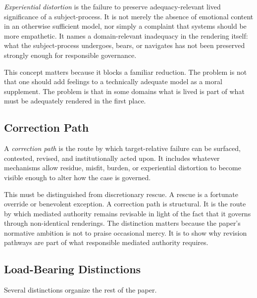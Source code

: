 \documentclass[11pt]{article}
\renewcommand{\emph}[1]{\textit{#1}}
\begin{document}
\emph{Experiential distortion} is the failure to preserve adequacy-relevant lived significance of a subject-process. It is not merely the absence of emotional content in an otherwise sufficient model, nor simply a complaint that systems should be more empathetic. It names a domain-relevant inadequacy in the rendering itself: what the subject-process undergoes, bears, or navigates has not been preserved strongly enough for responsible governance. \cite{Swanson2026EmbeddedProcess,Fricker2007EpistemicInjustice}

This concept matters because it blocks a familiar reduction. The problem is not that one should add feelings to a technically adequate model as a moral supplement. The problem is that in some domains what is lived is part of what must be adequately rendered in the first place.

\subsection{Correction Path}

A \emph{correction path} is the route by which target-relative failure can be surfaced, contested, revised, and institutionally acted upon. It includes whatever mechanisms allow residue, misfit, burden, or experiential distortion to become visible enough to alter how the case is governed. \cite{Swanson2026MediatedJudgmentConstraint,Swanson2026ConstraintConditionDisclosure}

This must be distinguished from discretionary rescue. A rescue is a fortunate override or benevolent exception. A correction path is structural. It is the route by which mediated authority remains revisable in light of the fact that it governs through non-identical renderings. The distinction matters because the paper's normative ambition is not to praise occasional mercy. It is to show why revision pathways are part of what responsible mediated authority requires.

\subsection{Load-Bearing Distinctions}

Several distinctions organize the rest of the paper.
\end{document}
